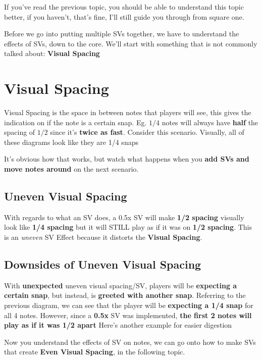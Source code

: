 If you've read the previous topic, you should be able to understand this topic better, if you haven't, that's fine, I'll still guide you through from square one.

\noindent
Before we go into putting multiple SVs together, we have to understand the effects of SVs, down to the core. We'll start with something that is not commonly talked about: \textbf{Visual Spacing}

\section{Visual Spacing}
Visual Spacing is the space in between notes that players will see, this gives the indication on if the note is a certain snap. Eg. $1/4$ notes will always have \textbf{half} the spacing of $1/2$ since it's \textbf{twice as fast}.\newline
Consider this scenario. Visually, all of these diagrams look like they are 1/4 snaps



It's obvious how that works, but watch what happens when you \textbf{add SVs and move notes around} on the next scenario. \newpage



\subsection{Uneven Visual Spacing}

With regards to what an SV does, a 0.5x SV will make \textbf{1/2 spacing} visually look like \textbf{1/4 spacing} but it will STILL play as if it was on \textbf{1/2 spacing}. This is an \textit{uneven} SV Effect because it distorts the \textbf{Visual Spacing}. 

\subsection{Downsides of Uneven Visual Spacing}

With \textbf{unexpected} uneven visual spacing/SV, players will be \textbf{expecting a certain snap}, but instead, is \textbf{greeted with another snap}.\newline
Referring to the previous diagram, we can see that the player will be \textbf{expecting a 1/4 snap} for all 4 notes. However, since a \textbf{0.5x} SV was implemented, \textbf{the first 2 notes will play as if it was 1/2 apart}
\noindent
Here's another example for easier digestion



Now you understand the effects of SV on notes, we can go onto how to make SVs that create \textbf{Even Visual Spacing}, in the following topic.\newpage

